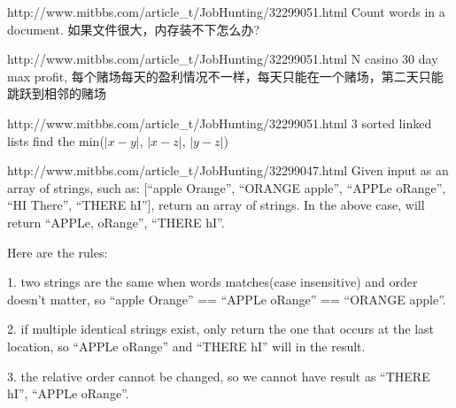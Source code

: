 \documentclass[a4paper]{article}
\begin{document}
\begin{CJK}{UTF8}{gbsn}
\begin{enumerate}
\begin{Q}[Apple]{http://www.mitbbs.com/article_t/JobHunting/32299051.html}
Count words in a document. 如果文件很大，内存装不下怎么办?
\end{Q}

\begin{Q}[Apple]{http://www.mitbbs.com/article_t/JobHunting/32299051.html}
N casino 30 day max profit, 每个赌场每天的盈利情况不一样，每天只能在一个赌场，第二天只能跳跃到相邻的赌场
\end{Q}

\begin{Q}[Apple]{http://www.mitbbs.com/article_t/JobHunting/32299051.html}
3 sorted linked lists find the min($|x-y|$, $|x-z|$, $|y-z|$)
\end{Q}

\begin{Q}{http://www.mitbbs.com/article_t/JobHunting/32299047.html}
Given input as an array of strings, such as: [``apple Orange'', ``ORANGE apple'', ``APPLe oRange'', ``HI There'', ``THERE hI''], return an array of strings. In the above case, will return ``APPLe, oRange'', ``THERE hI''.

Here are the rules:

1. two strings are the same when words matches(case insensitive) and order doesn't matter, so ``apple Orange'' == ``APPLe oRange'' == ``ORANGE apple''.

2. if multiple identical strings exist, only return the one that occurs at the last location, so ``APPLe oRange'' and ``THERE hI'' will in the result.

3.  the relative order cannot be changed, so we cannot have result as ``THERE hI'', ``APPLe oRange''.
\end{Q}

\end{enumerate}
\end{CJK}
\end{document}
